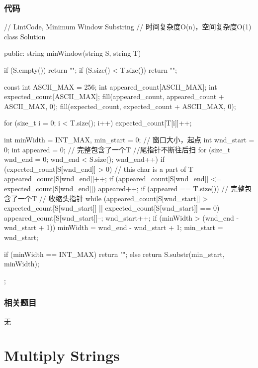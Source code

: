\subsubsection{代码}
\begin{Code}
// LintCode, Minimum Window Substring
// 时间复杂度O(n)，空间复杂度O(1)
class Solution {
public:
    string minWindow(string S, string T) {
        if (S.empty()) return "";
        if (S.size() < T.size()) return "";

        const int ASCII_MAX = 256;
        int appeared_count[ASCII_MAX];
        int expected_count[ASCII_MAX];
        fill(appeared_count, appeared_count + ASCII_MAX, 0);
        fill(expected_count, expected_count + ASCII_MAX, 0);

        for (size_t i = 0; i < T.size(); i++) expected_count[T[i]]++;

        int minWidth = INT_MAX, min_start = 0;  // 窗口大小，起点
        int wnd_start = 0;
        int appeared = 0;  // 完整包含了一个T
        //尾指针不断往后扫
        for (size_t wnd_end = 0; wnd_end < S.size(); wnd_end++) {
            if (expected_count[S[wnd_end]] > 0)  {  // this char is a part of T
                appeared_count[S[wnd_end]]++;
                if (appeared_count[S[wnd_end]] <= expected_count[S[wnd_end]])
                    appeared++;
            }
            if (appeared == T.size()) {  // 完整包含了一个T
                // 收缩头指针
                while (appeared_count[S[wnd_start]] > expected_count[S[wnd_start]]
                        || expected_count[S[wnd_start]] == 0) {
                    appeared_count[S[wnd_start]]--;
                    wnd_start++;
                }
                if (minWidth > (wnd_end - wnd_start + 1)) {
                    minWidth = wnd_end - wnd_start + 1;
                    min_start = wnd_start;
                }
            }
        }

        if (minWidth == INT_MAX) return "";
        else return S.substr(min_start, minWidth);
    }
};
\end{Code}


\subsubsection{相关题目}

\begindot
\item 无
\myenddot


\section{Multiply Strings} %
\label{sec:multiply-strings}


